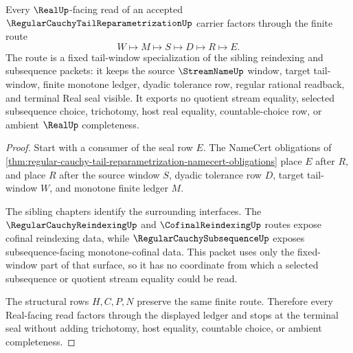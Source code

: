 \begin{theorem}
\label{thm:regular-cauchy-tail-reparametrization-fixed-window-route}
Every $\RealUp$-facing read of an accepted $\RegularCauchyTailReparametrizationUp$ carrier factors through the finite route
$$
W \longmapsto M \longmapsto S \longmapsto D \longmapsto R \longmapsto E .
$$
The route is a fixed tail-window specialization of the sibling reindexing and subsequence packets: it keeps the source $\StreamNameUp$ window, target tail-window, finite monotone ledger, dyadic tolerance row, regular rational readback, and terminal Real seal visible. It exports no quotient stream equality, selected subsequence choice, trichotomy, host real equality, countable-choice row, or ambient $\RealUp$ completeness.
\end{theorem}
\begin{proof}
Start with a consumer of the seal row $E$. The NameCert obligations of \autoref{thm:regular-cauchy-tail-reparametrization-namecert-obligations} place $E$ after $R$, and place $R$ after the source window $S$, dyadic tolerance row $D$, target tail-window $W$, and monotone finite ledger $M$.

The sibling chapters identify the surrounding interfaces. The $\RegularCauchyReindexingUp$ and $\CofinalReindexingUp$ routes expose cofinal reindexing data, while $\RegularCauchySubsequenceUp$ exposes subsequence-facing monotone-cofinal data. This packet uses only the fixed-window part of that surface, so it has no coordinate from which a selected subsequence or quotient stream equality could be read.

The structural rows $H,C,P,N$ preserve the same finite route. Therefore every Real-facing read factors through the displayed ledger and stops at the terminal seal without adding trichotomy, host equality, countable choice, or ambient completeness.
\end{proof}



